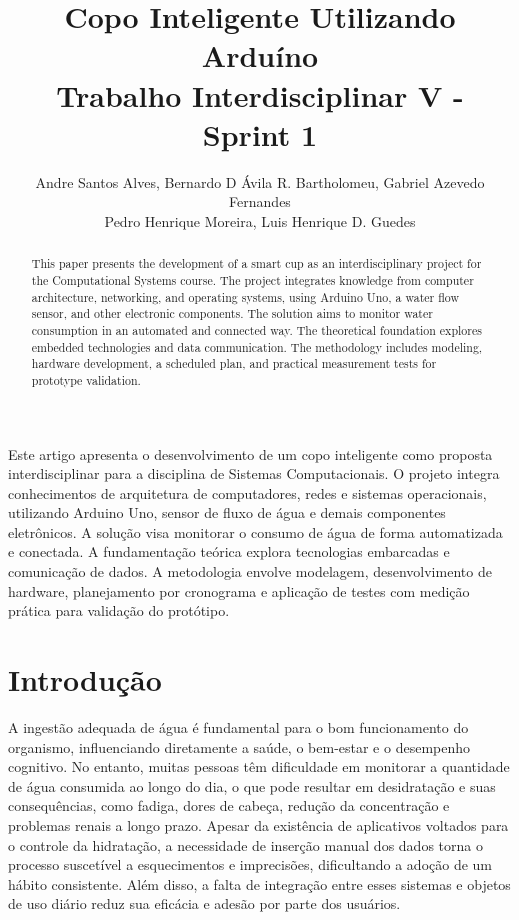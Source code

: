 \documentclass[12pt]{article}
\title{ Copo Inteligente Utilizando Arduíno\\ Trabalho Interdisciplinar V - Sprint 1}
\author{
Andre Santos Alves\inst{1}, Bernardo D Ávila R. Bartholomeu\inst{1}, Gabriel Azevedo Fernandes\inst{1} \\
Pedro Henrique Moreira\inst{2}, Luis Henrique D. Guedes\inst{3}
}
\begin{document}
 

\maketitle

\begin{abstract}
  This paper presents the development of a smart cup as an interdisciplinary project for the Computational Systems course. The project integrates knowledge from computer architecture, networking, and operating systems, using Arduino Uno, a water flow sensor, and other electronic components. The solution aims to monitor water consumption in an automated and connected way. The theoretical foundation explores embedded technologies and data communication. The methodology includes modeling, hardware development, a scheduled plan, and practical measurement tests for prototype validation.
\end{abstract}
     
\begin{resumo} 
  Este artigo apresenta o desenvolvimento de um copo inteligente como proposta interdisciplinar para a disciplina de Sistemas Computacionais. O projeto integra conhecimentos de arquitetura de computadores, redes e sistemas operacionais, utilizando Arduino Uno, sensor de fluxo de água e demais componentes eletrônicos. A solução visa monitorar o consumo de água de forma automatizada e conectada. A fundamentação teórica explora tecnologias embarcadas e comunicação de dados. A metodologia envolve modelagem, desenvolvimento de hardware, planejamento por cronograma e aplicação de testes com medição prática para validação do protótipo.
\end{resumo}

\newpage

\section{Introdução} \label{sec:firstpage}

A ingestão adequada de água é fundamental para o bom funcionamento do organismo, influenciando diretamente a saúde, o bem-estar e o desempenho cognitivo. No entanto, muitas pessoas têm dificuldade em monitorar a quantidade de água consumida ao longo do dia, o que pode resultar em desidratação e suas consequências, como fadiga, dores de cabeça, redução da concentração e problemas renais a longo prazo. Apesar da existência de aplicativos voltados para o controle da hidratação, a necessidade de inserção manual dos dados torna o processo suscetível a esquecimentos e imprecisões, dificultando a adoção de um hábito consistente. Além disso, a falta de integração entre esses sistemas e objetos de uso diário reduz sua eficácia e adesão por parte dos usuários.
\end{document}
